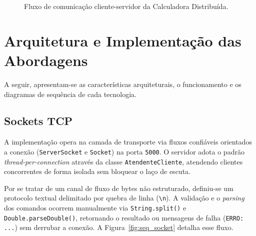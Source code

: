 \documentclass[12pt, a4paper]{article}
\begin{document}
\begin{figure}[H]
    \centering
    \caption{Fluxo de comunicação cliente-servidor da Calculadora Distribuída.}
    \label{fig:fluxo_geral}
\end{figure}

\section{Arquitetura e Implementação das Abordagens}

A seguir, apresentam-se as características arquiteturais, o funcionamento e os diagramas de sequência de cada tecnologia.

\subsection{Sockets TCP}

A implementação opera na camada de transporte via fluxos confiáveis orientados a conexão (\texttt{ServerSocket} e \texttt{Socket}) na porta \texttt{5000}. O servidor adota o padrão \textit{thread-per-connection} através da classe \texttt{AtendenteCliente}, atendendo clientes concorrentes de forma isolada sem bloquear o laço de escuta.

Por se tratar de um canal de fluxo de bytes não estruturado, definiu-se um protocolo textual delimitado por quebra de linha (\texttt{\textbackslash n}). A validação e o \textit{parsing} dos comandos ocorrem manualmente via \texttt{String.split()} e \texttt{Double.parseDouble()}, retornando o resultado ou mensagens de falha (\texttt{ERRO: ...}) sem derrubar a conexão. A Figura~\ref{fig:seq_socket} detalha esse fluxo.
\end{document}
